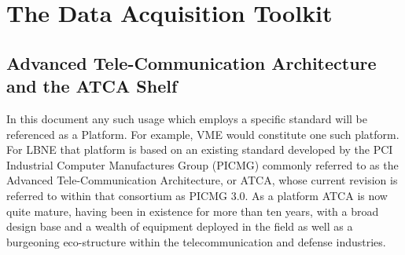 \section{The Data Acquisition Toolkit}





\subsection{Advanced Tele-Communication Architecture and the ATCA Shelf}
\label{sec:ATCA}

In this document any such usage which employs a specific standard will be referenced as a Platform. For example, VME would constitute one such platform. For LBNE that platform is based on an existing standard developed by the PCI Industrial Computer Manufactures Group (PICMG) commonly referred to as the Advanced Tele-Communication Architecture, or ATCA, whose current revision is referred to within that consortium as PICMG 3.0. As a platform ATCA is now quite mature, having been in existence for more than ten years, with a broad design base and a wealth of equipment deployed in the field as well as a burgeoning eco-structure within the telecommunication and defense industries.

